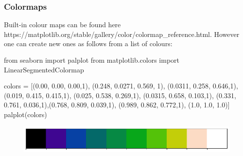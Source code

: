 \documentclass[
  letterpaper,
  DIV=11,
  numbers=noendperiod]{scrreprt}
\newenvironment{Shaded}{\begin{snugshade}}{\end{snugshade}}
\newcommand{\DecValTok}[1]{\textcolor[rgb]{0.68,0.00,0.00}{#1}}
\newcommand{\FloatTok}[1]{\textcolor[rgb]{0.68,0.00,0.00}{#1}}
\newcommand{\ImportTok}[1]{\textcolor[rgb]{0.00,0.46,0.62}{#1}}
\newcommand{\NormalTok}[1]{\textcolor[rgb]{0.00,0.23,0.31}{#1}}
\newcommand{\OperatorTok}[1]{\textcolor[rgb]{0.37,0.37,0.37}{#1}}
\begin{document}
\hypertarget{colormaps}{%
\subsubsection{Colormaps}\label{colormaps}}

Built-in colour maps can be found here
https://matplotlib.org/stable/gallery/color/colormap\_reference.html.
However one can create new ones as follows from a list of colours:

\begin{Shaded}
\begin{Highlighting}[]
\ImportTok{from}\NormalTok{ seaborn }\ImportTok{import}\NormalTok{ palplot}
\ImportTok{from}\NormalTok{ matplotlib.colors }\ImportTok{import}\NormalTok{ LinearSegmentedColormap}

\NormalTok{colors }\OperatorTok{=}\NormalTok{ [(}\FloatTok{0.00}\NormalTok{, }\FloatTok{0.00}\NormalTok{, }\FloatTok{0.00}\NormalTok{,}\DecValTok{1}\NormalTok{), (}\FloatTok{0.248}\NormalTok{, }\FloatTok{0.0271}\NormalTok{, }\FloatTok{0.569}\NormalTok{, }\DecValTok{1}\NormalTok{), (}\FloatTok{0.0311}\NormalTok{, }\FloatTok{0.258}\NormalTok{, }\FloatTok{0.646}\NormalTok{,}\DecValTok{1}\NormalTok{),}
\NormalTok{            (}\FloatTok{0.019}\NormalTok{, }\FloatTok{0.415}\NormalTok{, }\FloatTok{0.415}\NormalTok{,}\DecValTok{1}\NormalTok{), (}\FloatTok{0.025}\NormalTok{, }\FloatTok{0.538}\NormalTok{, }\FloatTok{0.269}\NormalTok{,}\DecValTok{1}\NormalTok{), (}\FloatTok{0.0315}\NormalTok{, }\FloatTok{0.658}\NormalTok{, }\FloatTok{0.103}\NormalTok{,}\DecValTok{1}\NormalTok{),}
\NormalTok{            (}\FloatTok{0.331}\NormalTok{, }\FloatTok{0.761}\NormalTok{, }\FloatTok{0.036}\NormalTok{,}\DecValTok{1}\NormalTok{),(}\FloatTok{0.768}\NormalTok{, }\FloatTok{0.809}\NormalTok{, }\FloatTok{0.039}\NormalTok{,}\DecValTok{1}\NormalTok{), (}\FloatTok{0.989}\NormalTok{, }\FloatTok{0.862}\NormalTok{, }\FloatTok{0.772}\NormalTok{,}\DecValTok{1}\NormalTok{),}
\NormalTok{            (}\FloatTok{1.0}\NormalTok{, }\FloatTok{1.0}\NormalTok{, }\FloatTok{1.0}\NormalTok{)]}
\NormalTok{palplot(colors)}
\end{Highlighting}
\end{Shaded}

\begin{figure}[H]

{\centering \includegraphics{labs/w02_maps_files/figure-pdf/cell-29-output-1.png}

}

\end{figure}
\end{document}

